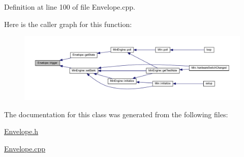 Definition at line 100 of file Envelope.\+cpp.

Here is the caller graph for this function\+:
\nopagebreak
\begin{figure}[H]
\begin{center}
\leavevmode
\includegraphics[width=350pt]{d7/df3/class_envelope_a03b0aeb7f8550ec701e3a07839ad47ec_icgraph}
\end{center}
\end{figure}


The documentation for this class was generated from the following files\+:\begin{DoxyCompactItemize}
\item 
\hyperlink{_envelope_8h}{Envelope.\+h}\item 
\hyperlink{_envelope_8cpp}{Envelope.\+cpp}\end{DoxyCompactItemize}

